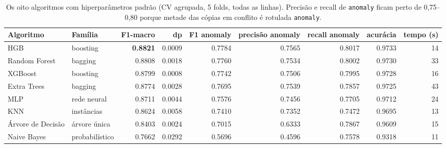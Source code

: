 \documentclass[11pt,a4paper]{article}
\begin{document}
\begin{table}[H]
\centering
\caption{Os oito algoritmos com hiperparâmetros padrão (CV agrupada, 5 folds, todas as linhas). Precisão e recall de \texttt{anomaly} ficam perto de 0,75--0,80 porque metade das cópias em conflito é rotulada \texttt{anomaly}.}
\label{tab:algoritmos}
\begin{adjustbox}{max width=\linewidth}
\begin{tabular}{llrrrrrrr}
\toprule
Algoritmo & Família & F1-macro & dp & F1 anomaly & precisão anomaly & recall anomaly & acurácia & tempo (s) \\
\midrule
HGB & boosting & \textbf{0.8821} & 0.0009 & 0.7784 & 0.7565 & 0.8017 & 0.9733 & 14 \\
Random Forest & bagging & 0.8808 & 0.0018 & 0.7760 & 0.7534 & 0.8002 & 0.9730 & 33 \\
XGBoost & boosting & 0.8799 & 0.0008 & 0.7742 & 0.7506 & 0.7995 & 0.9728 & 16 \\
Extra Trees & bagging & 0.8774 & 0.0028 & 0.7695 & 0.7539 & 0.7857 & 0.9725 & 43 \\
MLP & rede neural & 0.8711 & 0.0044 & 0.7576 & 0.7456 & 0.7705 & 0.9712 & 24 \\
KNN & instâncias & 0.8624 & 0.0058 & 0.7410 & 0.7352 & 0.7472 & 0.9695 & 13 \\
Árvore de Decisão & árvore única & 0.8403 & 0.0024 & 0.7015 & 0.6333 & 0.7867 & 0.9609 & 15 \\
Naive Bayes & probabilístico & 0.7662 & 0.0292 & 0.5696 & 0.4596 & 0.7578 & 0.9318 & 11 \\
\bottomrule
\end{tabular}
\end{adjustbox}
\end{table}
\end{document}
